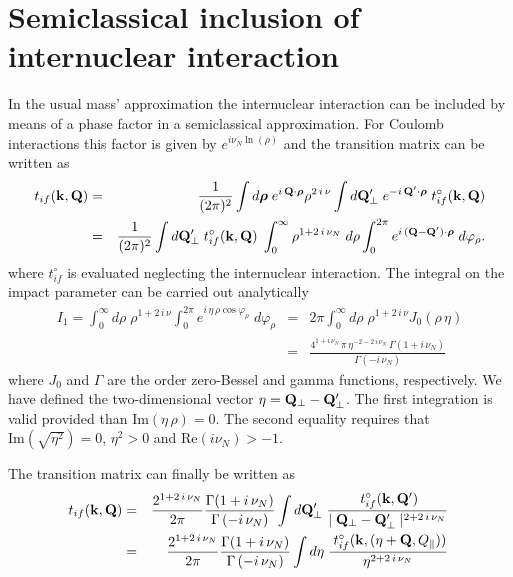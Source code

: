 \section{Semiclassical inclusion of internuclear interaction}

In the usual mass' approximation the internuclear interaction can be
included by means of a phase factor in a semiclassical approximation.
For Coulomb interactions this factor is given by $e^{i
\nu_{N}\ln(\rho)}$ and the transition matrix can be written as
%
\begin{eqnarray}\label{Q:Npot-semic}
t_{if}(\mathbf{k},\mathbf{Q}) &=& \frac{1}{(2 \pi)^{2}} \int d \boldsymbol{\rho} \;
e^{i \, \mathbf{Q} \cdot \boldsymbol{\rho} } \rho^{2 \, i \, \nu} \int d
\mathbf{Q}_{\perp}' \; e^{- i \, \mathbf{Q}' \cdot \boldsymbol{\rho} } \;
t^{\circ}_{if}(\mathbf{k},\mathbf{Q}) \nonumber \\
  &=&
\frac{1}{(2 \pi)^{2}} \int d \mathbf{Q}_{\perp}' \;
t^{\circ}_{if}(\mathbf{k},\mathbf{Q}) \; \int_{0}^{\infty}  \rho^{ 1 + 2 \, i \,
\nu_{N}} \; d \rho \int_{0}^{2 \pi} e^{i \, (\mathbf{Q}- \mathbf{Q}')
\cdot \boldsymbol{\rho}} \; d \varphi_{\rho}.
\end{eqnarray}
%
where $t^{\circ}_{if}$ is evaluated neglecting the internuclear interaction.
The integral on the impact parameter can be carried out analytically
\begin{eqnarray}\label{Q:Npot-semic1}
I_{1}=\int_{0}^{\infty} d \rho \; \rho^{ 1 + 2 \, i \, \nu}
\int_{0}^{2 \pi} e^{i \, \eta\, \rho \cos{\varphi_{\rho}}} \;
d \varphi_{\rho} &=& 2 \pi \int_{0}^{\infty} d \rho \; \rho^{1 +
2 \, i \, \nu} J_{0}(\rho \,\eta)
  \\ &=&
\frac{{4^{1 + i\,\nu_{N}}}\,\pi \, \eta^{-2 - 2\, i\,\nu_{N}}\,
\Gamma(1 + i\,\nu_{N})} {\Gamma\left(- i\,\nu_{N} \right)}
\nonumber
\end{eqnarray}
where $J_{0}$ and $\Gamma$ are the order zero-Bessel and gamma
functions, respectively. We have defined the two-dimensional vector
$\mathbf{\eta}=\mathbf{Q}_{\perp}-\mathbf{Q}_{\perp}'$. The first integration is
valid provided than $\textrm{Im}\left(\eta \, \rho \right)=0$. The
second equality requires that $\textrm{Im}\left(\sqrt{\eta^{2}}
\right)=0$, $\eta^{2} > 0$ and $\textrm{Re}\left( i \nu_{N} \right)
> -1$.

The transition matrix can finally be written as
\begin{eqnarray}\label{Q:tifNsemic}
t_{if}(\mathbf{k},\mathbf{Q}) &=& \frac{2^{1 + 2\,i\,\nu_{N}}}{2 \pi}
\frac{\Gamma(1 + i\,\nu_{N})} {\Gamma\left(- i\,\nu_{N} \right)}
\int d \mathbf{Q}'_{\perp} \; \frac{\; t^{\circ}_{if}(\mathbf{k},\mathbf{Q}')} {\mid
\mathbf{Q}_{\perp}-\mathbf{Q}'_{\perp}\mid ^{2 + 2\, i\,\nu_{N}}}\,
\nonumber
\\
&=& \frac{2^{1 + 2\,i\,\nu_{N}}}{2 \pi} \frac{\Gamma(1 +
i\,\nu_{N})} {\Gamma\left(- i\,\nu_{N} \right)} \int d
\mathbf{\eta} \; \frac{\; t^{\circ}_{if}(\mathbf{k},(\mathbf{\eta}+\mathbf{Q},Q_{\parallel}))}
{\eta^{2 + 2\, i\,\nu_{N}}}\,
\end{eqnarray}

